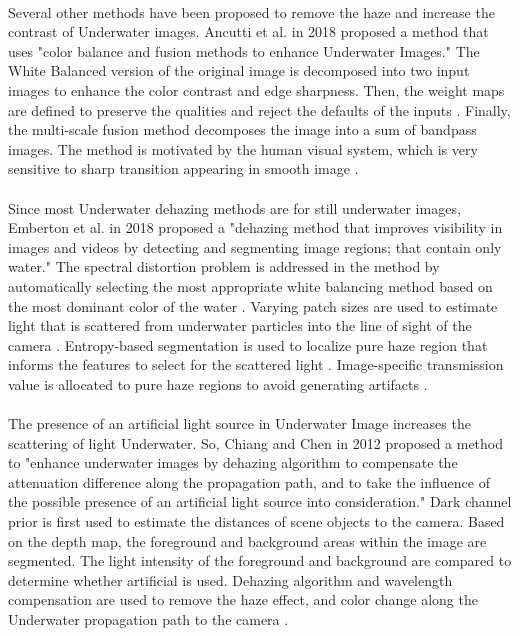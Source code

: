 \documentclass[a4paper,11pt,oneside]{article}
\begin{document}
  \\
  Several other methods have been proposed to remove the haze and increase the contrast of Underwater images. Ancutti et al. in 2018 \cite{16} proposed a method that uses "color balance and fusion methods to enhance Underwater Images." The White Balanced version of the original image is decomposed into two input images to enhance the color contrast and edge sharpness. Then, the weight maps are defined to preserve the qualities and reject the defaults of the inputs \cite{16}. Finally, the multi-scale fusion method decomposes the image into a sum of bandpass images. The method is motivated by the human visual system, which is very sensitive to sharp transition appearing in smooth image \cite{16}.\\
  \\
  Since most Underwater dehazing methods are for still underwater images, Emberton et al. \cite{2} in 2018 proposed a "dehazing method that improves visibility in images and videos by detecting and segmenting image regions; that contain only water." The spectral distortion problem is addressed in the method by automatically selecting the most appropriate white balancing method based on the most dominant color of the water \cite{2}. Varying patch sizes are used to estimate light that is scattered from underwater particles into the line of sight of the camera \cite{2}. Entropy-based segmentation is used to localize pure haze region that informs the features to select for the scattered light \cite{2}. Image-specific transmission value is allocated to pure haze regions to avoid generating artifacts \cite{2}.\\
  \\
   The presence of an artificial light source in Underwater Image increases the scattering of light Underwater. So, Chiang and Chen in 2012 \cite{13} proposed a method to "enhance underwater images by dehazing algorithm to compensate the attenuation difference along the propagation path, and to take the influence of the possible presence of an artificial light source into consideration." Dark channel prior is first used to estimate the distances of scene objects to the camera. Based on the depth map, the foreground and background areas within the image are segmented. The light intensity of the foreground and background are compared to determine whether artificial is used. Dehazing algorithm and wavelength compensation are used to remove the haze effect, and color change along the Underwater propagation path to the camera \cite{13}.\\
\end{document}
